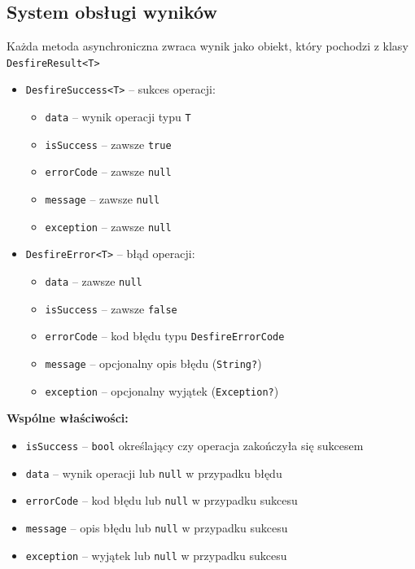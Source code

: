 \documentclass[a4paper,12pt]{article}
\begin{document}
\subsection{System obsługi wyników}
Każda metoda asynchroniczna zwraca wynik jako obiekt, który pochodzi z klasy \texttt{DesfireResult<T>}

\begin{itemize}
    \item \texttt{DesfireSuccess<T>} -- sukces operacji:
    \begin{itemize}
        \item \texttt{data} -- wynik operacji typu \texttt{T}
        \item \texttt{isSuccess} -- zawsze \texttt{true}
        \item \texttt{errorCode} -- zawsze \texttt{null}
        \item \texttt{message} -- zawsze \texttt{null}
        \item \texttt{exception} -- zawsze \texttt{null}
    \end{itemize}
    \item \texttt{DesfireError<T>} -- błąd operacji:
    \begin{itemize}
        \item \texttt{data} -- zawsze \texttt{null}
        \item \texttt{isSuccess} -- zawsze \texttt{false}
        \item \texttt{errorCode} -- kod błędu typu \texttt{DesfireErrorCode}
        \item \texttt{message} -- opcjonalny opis błędu (\texttt{String?})
        \item \texttt{exception} -- opcjonalny wyjątek (\texttt{Exception?})
    \end{itemize}
\end{itemize}

\textbf{Wspólne właściwości:}
\begin{itemize}
    \item \texttt{isSuccess} -- \texttt{bool} określający czy operacja zakończyła się sukcesem
    \item \texttt{data} -- wynik operacji lub \texttt{null} w przypadku błędu
    \item \texttt{errorCode} -- kod błędu lub \texttt{null} w przypadku sukcesu
    \item \texttt{message} -- opis błędu lub \texttt{null} w przypadku sukcesu
    \item \texttt{exception} -- wyjątek lub \texttt{null} w przypadku sukcesu
\end{itemize}
\end{document}
